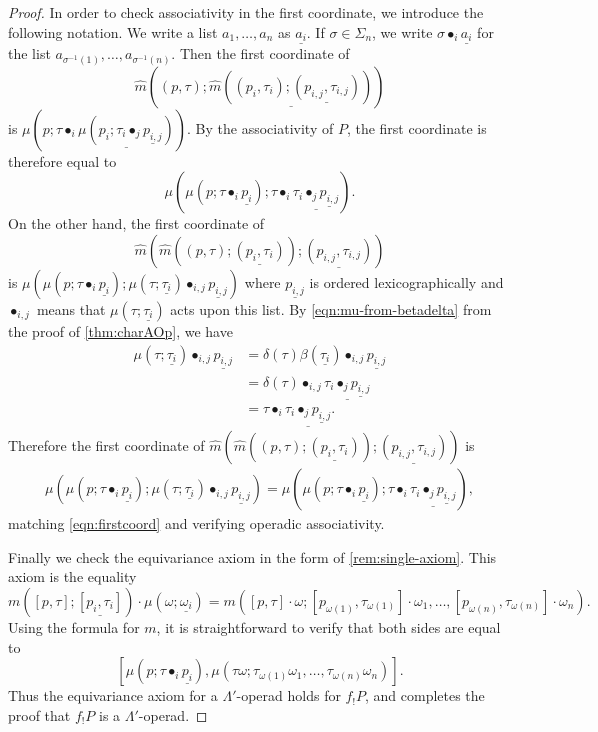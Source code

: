 \begin{proof}
In order to check associativity in the first coordinate, we introduce the following notation.
We write a list $a_1, \ldots, a_n$ as $\underline{a_i}$. If $\sigma \in \Sigma_n$, we write $\sigma \bullet_i \underline{a_i}$ for the list $a_{\sigma^{-1}(1)}, \ldots, a_{\sigma^{-1}(n)}$. Then the first coordinate of
\[
\hat{m}\left( (p,\tau); \underline{ \hat{m}\left( (p_i, \tau_i); \underline{ (p_{i,j}, \tau_{i,j})} \right) } \right)
\]
is $\mu\left( p; \tau \bullet_i \underline{ \mu(p_i; \tau_i \bullet_j \underline{p_{i,j}}) } \right)$. 
By the associativity of $P$, the first coordinate is therefore equal to
\begin{equation}\label{eqn:firstcoord}
\mu\left( \mu(p; \tau \bullet_i \underline{p_i}); \tau \bullet_i \underline{\tau_i \bullet_j \underline{p_{i,j}}} \right).
\end{equation}
On the other hand, the first coordinate of
\[
\hat{m}\left( \hat{m}\left( (p,\tau); \underline{ (p_i, \tau_i) }\right); \underline{ (p_{i,j}, \tau_{i,j}) } \right)
\]
is $\mu\left( \mu(p; \tau \bullet_i \underline{p_i}); \mu(\tau; \underline{\tau_i}) \bullet_{i,j} \underline{p_{i,j}} \right)$ where $\underline{p_{i,j}}$ is ordered lexicographically and $\bullet_{i,j}$ means that $\mu(\tau; \underline{\tau_i})$ acts upon this list. By \cref{eqn:mu-from-betadelta} from the proof of \cref{thm:charAOp}, we have
\begin{align*}
\mu(\tau; \underline{\tau_i}) \bullet_{i,j} \underline{p_{i,j}} & = \delta(\tau)\beta(\underline{\tau_i}) \bullet_{i,j} \underline{p_{i,j}} \\
& = \delta(\tau) \bullet_{i,j} \underline{ \tau_i \bullet_j \underline{p_{i,j}}} \\
& = \tau \bullet_i \underline{\tau_i \bullet_j \underline{p_{i,j}}}.
\end{align*}
Therefore the first coordinate of $\hat{m}\left( \hat{m}\left( (p,\tau); \underline{ (p_i, \tau_i) }\right); \underline{ (p_{i,j}, \tau_{i,j}) } \right)$ is
\begin{align*}
\mu\left( \mu(p; \tau \bullet_i \underline{p_i}); \mu(\tau; \underline{\tau_i}) \bullet_{i,j} \underline{p_{i,j}} \right) = \mu\left( \mu(p; \tau \bullet_i \underline{p_i}); \tau \bullet_i \underline{\tau_i \bullet_j \underline{p_{i,j}}} \right),
\end{align*}
matching \cref{eqn:firstcoord} and verifying operadic associativity.

Finally we check the equivariance axiom in the form of \cref{rem:single-axiom}. This axiom is the equality
\[
m\left( [p,\tau]; \underline{[p_i, \tau_i]}\right)\cdot \mu(\omega; \underline{\omega_i}) = 
m\left( [p,\tau]\cdot \omega; [p_{\omega(1)}, \tau_{\omega(1)}]\cdot \omega_1, \ldots, [p_{\omega(n)}, \tau_{\omega(n)}]\cdot \omega_n \right).
\]
Using the formula for $m$, it is straightforward to verify that both sides are equal to
\[
\left[ \mu(p; \tau \bullet_i \underline{p_i}), \mu(\tau \omega; \tau_{\omega(1)}\omega_1, \ldots, \tau_{\omega(n)}\omega_n) \right].
\]
Thus the equivariance axiom for a $\Lambda'$-operad holds for $f_{!}P$, and completes the proof that $f_{!}P$ is a $\Lambda'$-operad.


\end{proof}

